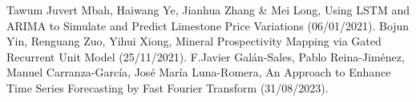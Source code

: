 \documentclass{ieeeojies}
\begin{document}
\begin{thebibliography}{00}
 Tawum Juvert Mbah, Haiwang Ye, Jianhua Zhang & Mei Long,
Using LSTM and ARIMA to Simulate and Predict Limestone Price Variations (06/01/2021).
 Bojun Yin, Renguang Zuo, Yihui Xiong, Mineral Prospectivity Mapping via Gated Recurrent Unit Model (25/11/2021).
 F.Javier Galán-Sales, Pablo Reina-Jiménez, Manuel Carranza-García, José María Luna-Romera, An Approach to Enhance Time Series Forecasting by Fast Fourier Transform (31/08/2023).

\end{thebibliography}


\EOD
\end{document}
